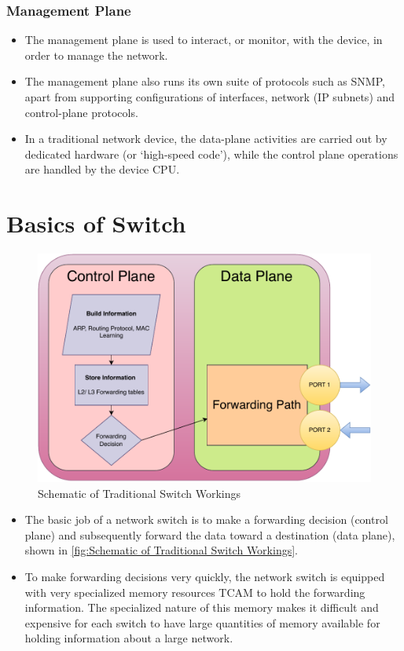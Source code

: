 \documentclass[12pt,letterpaper]{article}
\begin{document}
    \subsubsection{Management Plane}
        \begin{itemize}
            \item The management plane is used to interact, or monitor, with the device, in order to manage the network.
            \item The management plane also runs its own suite of protocols such as \ac{SNMP}, apart from supporting configurations of interfaces, network (IP subnets) and control-plane protocols.
            \item In a traditional network device, the data-plane activities are carried out by dedicated hardware (or ‘high-speed code’), while the control plane operations are handled by the device CPU.

        \end{itemize}

    \section{Basics of Switch}

    \begin{figure}[h]
        \centering
        \includegraphics[height = 8 cm]{images/basicSwitch.drawio.pdf}
        \caption{Schematic of Traditional Switch Workings}
        \label{fig:Schematic of Traditional Switch Workings}
    \end{figure}

    \begin{itemize}
        \item The basic job of a network switch is to make a forwarding decision (control plane) and subsequently forward the data toward a destination (data plane), shown in \autoref{fig:Schematic of Traditional Switch Workings}.
        \item To make forwarding decisions very quickly, the network switch is equipped with very specialized memory resources \ac{TCAM} to hold the forwarding information. The specialized nature of this memory makes it difficult and expensive for each switch to have large quantities of memory available for holding information about a large network.
    \end{itemize}
\end{document}
